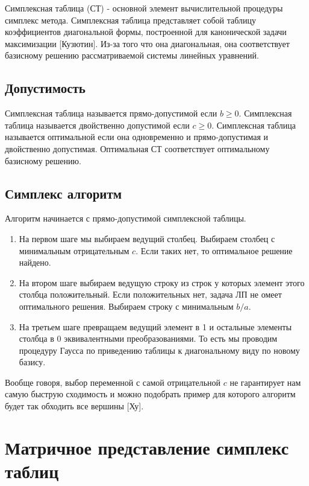 \documentclass[a4paper,article,14pt]{extarticle}
\begin{document}
Симплексная таблица (СТ) - основной элемент вычислительной процедуры симплекс метода.
Симплексная таблица представляет собой таблицу коэффициентов диагональной формы, построенной для канонической задачи максимизации [Кузютин].
Из-за того что она диагональная, она соответствует базисному решению рассматриваемой системы линейных уравнений.

\subsection{Допустимость}

Симплексная таблица называется прямо-допустимой если \(b \ge 0\).
Симплексная таблица называется двойственно допустимой если \(c \ge 0\).
Симплексная таблица называется оптимальной если она одновременно и прямо-допустимая и двойственно допустимая.
Оптимальная СТ соответствует оптимальному базисному решению.

\subsection{Симплекс алгоритм}

Алгоритм начинается с прямо-допустимой симплексной таблицы.

\begin{enumerate}
    \item
        На первом шаге мы выбираем ведущий столбец.
        Выбираем столбец с минимальным отрицательным \(c\).
        Если таких нет, то оптимальное решение найдено.
    \item
        На втором шаге выбираем ведущую строку из строк у которых элемент этого столбца положительный.
        Если положительных нет, задача ЛП не омеет оптимального решения.
        Выбираем строку с минимальным \(b/a\).
    \item
        На третьем шаге превращаем ведущий элемент в 1 и остальные элементы столбца в 0 эквивалентными преобразованиями.
        То есть мы проводим процедуру Гаусса по приведению таблицы к диагональному виду по новому базису.
\end{enumerate}

Вообще говоря, выбор переменной с самой отрицательной \(c\) не гарантирует нам самую быструю сходимость и можно подобрать пример для которого алгоритм будет так обходить все вершины [Ху].

\newpage

\section{Матричное представление симплекс таблиц}
\end{document}
